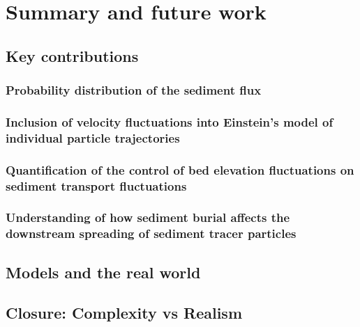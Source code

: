 
\chapter{Summary and future work}
\label{ch:conc}

\section{Key contributions}

\subsection{Probability distribution of the sediment flux}

\subsection{Inclusion of velocity fluctuations into Einstein's model of individual particle trajectories}


\subsection{Quantification of the control of bed elevation fluctuations on sediment transport fluctuations}


\subsection{Understanding of how sediment burial affects the downstream spreading of sediment tracer particles}


\section{Models and the real world}

\section{Closure: Complexity vs Realism}